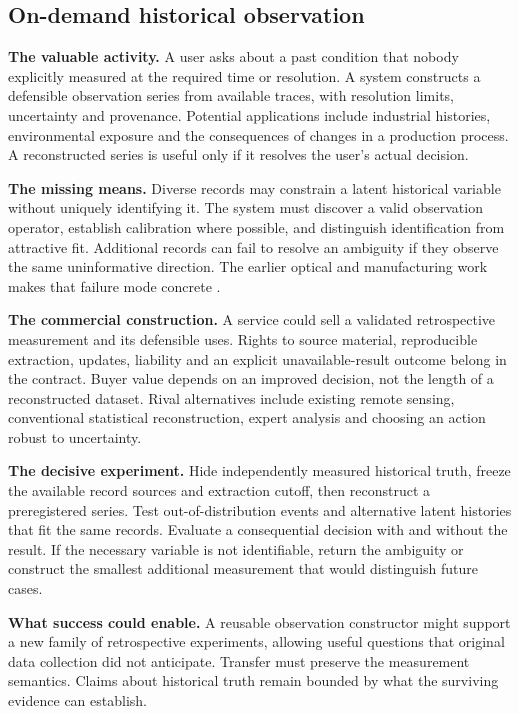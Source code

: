 \documentclass[11pt,letterpaper]{article}
\begin{document}
\subsection{On-demand historical observation}
\textbf{The valuable activity.} A user asks about a past condition that nobody explicitly measured at the required time or resolution. A system constructs a defensible observation series from available traces, with resolution limits, uncertainty and provenance. Potential applications include industrial histories, environmental exposure and the consequences of changes in a production process. A reconstructed series is useful only if it resolves the user's actual decision.

\textbf{The missing means.} Diverse records may constrain a latent historical variable without uniquely identifying it. The system must discover a valid observation operator, establish calibration where possible, and distinguish identification from attractive fit. Additional records can fail to resolve an ambiguity if they observe the same uninformative direction. The earlier optical and manufacturing work makes that failure mode concrete \cite{paired,report20261102}.

\textbf{The commercial construction.} A service could sell a validated retrospective measurement and its defensible uses. Rights to source material, reproducible extraction, updates, liability and an explicit unavailable-result outcome belong in the contract. Buyer value depends on an improved decision, not the length of a reconstructed dataset. Rival alternatives include existing remote sensing, conventional statistical reconstruction, expert analysis and choosing an action robust to uncertainty.

\textbf{The decisive experiment.} Hide independently measured historical truth, freeze the available record sources and extraction cutoff, then reconstruct a preregistered series. Test out-of-distribution events and alternative latent histories that fit the same records. Evaluate a consequential decision with and without the result. If the necessary variable is not identifiable, return the ambiguity or construct the smallest additional measurement that would distinguish future cases.

\textbf{What success could enable.} A reusable observation constructor might support a new family of retrospective experiments, allowing useful questions that original data collection did not anticipate. Transfer must preserve the measurement semantics. Claims about historical truth remain bounded by what the surviving evidence can establish.
\end{document}
